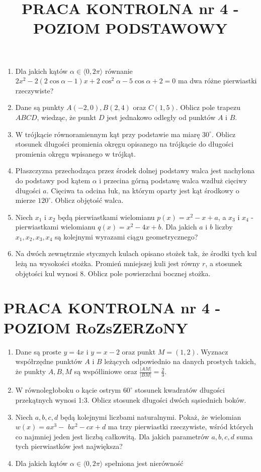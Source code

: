 \documentclass[10pt]{article}
\title{PRACA KONTROLNA nr 4 - POZIOM PODSTAWOWY }
\author{}
\date{}
\begin{document}
\maketitle
\begin{enumerate}
  \item Dla jakich kątów $\alpha \in\langle 0,2 \pi\rangle$ równanie $2 x^{2}-2(2 \cos \alpha-1) x+2 \cos ^{2} \alpha-5 \cos \alpha+2=0$ ma dwa różne pierwiastki rzeczywiste?
  \item Dane są punkty $A(-2,0), B(2,4)$ oraz $C(1,5)$. Oblicz pole trapezu $A B C D$, wiedząc, że punkt $D$ jest jednakowo odległy od punktów $A$ i $B$.
  \item W trójkącie równoramiennym kąt przy podstawie ma miarę $30^{\circ}$. Oblicz stosunek długości promienia okręgu opisanego na trójkącie do długości promienia okręgu wpisanego w trójkąt.
  \item Płaszczyzna przechodząca przez środek dolnej podstawy walca jest nachylona do podstawy pod kątem $\alpha$ i przecina górną podstawę walca wzdłuż cięciwy długości $a$. Cięciwa ta odcina łuk, na którym oparty jest kąt środkowy o mierze $120^{\circ}$. Oblicz objętość walca.
  \item Niech $x_{1}$ i $x_{2}$ będą pierwiastkami wielomianu $p(x)=x^{2}-x+a$, a $x_{3}$ i $x_{4}$ - pierwiastkami wielomianu $q(x)=x^{2}-4 x+b$. Dla jakich $a$ i $b$ liczby $x_{1}, x_{2}, x_{3}, x_{4}$ są kolejnymi wyrazami ciągu geometrycznego?
  \item Na dwóch zewnętrznie stycznych kulach opisano stożek tak, że środki tych kul leżą na wysokości stożka. Promień mniejszej kuli jest równy $r$, a stosunek objętości kul wynosi 8. Oblicz pole powierzchni bocznej stożka.
\end{enumerate}

\section*{PRACA KONTROLNA nr 4 - POZIOM RoZsZERZoNY}
\begin{enumerate}
  \item Dane są proste $y=4 x$ i $y=x-2$ oraz punkt $M=(1,2)$. Wyznacz współrzędne punktów $A$ i $B$ leżących odpowiednio na danych prostych takich, że punkty $A, B, M$ są współliniowe oraz $\frac{|A M|}{|B M|}=\frac{2}{3}$.
  \item W równoległoboku o kącie ostrym $60^{\circ}$ stosunek kwadratów długości przekątnych wynosi 1:3. Oblicz stosunek długości dwóch sąsiednich boków.
  \item Niech $a, b, c, d$ będą kolejnymi liczbami naturalnymi. Pokaż, że wielomian $w(x)=a x^{3}-$ $b x^{2}-c x+d$ ma trzy pierwiastki rzeczywiste, wśród których co najmniej jeden jest liczbą całkowitą. Dla jakich parametrów $a, b, c, d$ suma tych pierwiastków jest największa?
  \item Dla jakich kątów $\alpha \in\langle 0,2 \pi\rangle$ spełniona jest nierówność
\end{enumerate}
\end{document}

